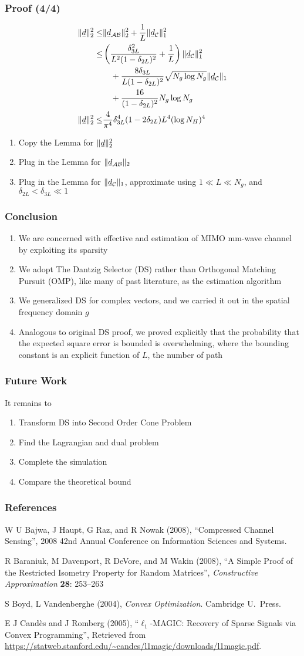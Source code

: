\documentclass{beamer}
\newcommand{\Disp}[1]{\begin{align} #1 \end{align}}
\newcommand{\NT}{\notag}
\renewcommand{\d}{\delta}
\newcommand{\I}{\item}
\newcommand{\MC}[1]{\mathcal{#1}}
\newcommand{\R}[1]{\sqrt{#1}}
\newcommand{\F}[1]{\frac{#1}}
\newcommand{\V}[1]{\stackunder[1.2pt]{$#1$}{\rule{.9ex}{.075ex}}}
\begin{document}
\begin{frame}
\frametitle{Proof (4/4)}
\Disp{
\| \V{d} \|_2^2
\leq &\|\V{d}_{\MC{A}\MC{B}}\|_2^2 +\F{1}{L} \|\V{d}_{\MC{C}}\|_1^2 \NT \\
\leq & \left( \F{\d_{3L}^2} {L^2 (1-\d_{2L})^2} +\F{1}{L} \right) \|\V{d}_{\MC{C}}\|_1^2 \NT \\
&\quad +\F{8 \d_{3L}} {L (1-\d_{2L})^2} \R{N_g \log N_g} \|\V{d}_{\MC{C}}\|_1 \NT \\
&\quad +\F{16}{(1-\d_{2L})^2} N_g \log N_g \\
\|\V{d}\|_2^2
\leq &\F{4}{\pi^4} \d_{3L}^4 (1-2\d_{2L}) L^4 ( \log N_H )^4
}
\begin{enumerate}
\I Copy the Lemma for \(\| \V{d} \|_2^2\)
\I Plug in the Lemma for \(\|\V{d}_{\MC{A}\MC{B}}\|_2\)
\I Plug in the Lemma for \(\|\V{d}_{\MC{C}}\|_1\), approximate using \(1 \ll L \ll N_g\), and \(\d_{2L} <\d_{3L} \ll 1\)
\end{enumerate}
\end{frame}

\begin{frame}
\frametitle{Conclusion}
\begin{enumerate}
\I We are concerned with effective and estimation of MIMO mm-wave channel by exploiting its sparsity
\I We adopt The Dantzig Selector (DS) rather than Orthogonal Matching Pursuit (OMP), like many of past literature, as the estimation algorithm
\I We generalized DS for complex vectors, and we carried it out in the spatial frequency domain \(g\)
\I Analogous to original DS proof, we proved explicitly that the probability that the expected square error is bounded is overwhelming, where the bounding constant is an explicit function of \(L\), the number of path
\end{enumerate}
\end{frame}

\begin{frame}
\frametitle{Future Work}
It remains to
\begin{enumerate}
\I Transform DS into Second Order Cone Problem
\I Find the Lagrangian and dual problem
\I Complete the simulation
\I Compare the theoretical bound
\end{enumerate}
\end{frame}

\begin{frame}
\frametitle{References}
\begin{enumerate}
{ \small
\I W U Bajwa, J Haupt, G Raz, and R Nowak (2008), ``Compressed Channel Sensing'', 2008 42nd Annual Conference on Information Sciences and Systems.
\I R Baraniuk, M Davenport, R DeVore, and M Wakin (2008), ``A Simple Proof of the Restricted Isometry Property for Random Matrices'', \textit{Constructive Approximation} \textbf{28}: 253–263
\I S Boyd, L Vandenberghe (2004), \textit{Convex Optimization}. Cambridge U.\ Press.
\I E J Cand\`es and J Romberg (2005), ``\(\ell_1\)-MAGIC: Recovery of Sparse Signals via Convex Programming'', Retrieved from \url{https://statweb.stanford.edu/~candes/l1magic/downloads/l1magic.pdf}.
}
\end{enumerate}
\end{frame}
\end{document}
